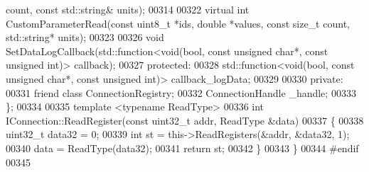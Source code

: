 \begin{DoxyCode}
      count, \textcolor{keyword}{const} std::string& units);
00314 
00322     \textcolor{keyword}{virtual} \textcolor{keywordtype}{int} CustomParameterRead(\textcolor{keyword}{const} uint8\_t *ids, \textcolor{keywordtype}{double} *values, \textcolor{keyword}{const} \textcolor{keywordtype}{size\_t} 
      count, std::string* units);
00323 
00326     \textcolor{keywordtype}{void} SetDataLogCallback(std::function<\textcolor{keywordtype}{void}(\textcolor{keywordtype}{bool}, \textcolor{keyword}{const} \textcolor{keywordtype}{unsigned} \textcolor{keywordtype}{char}*, \textcolor{keyword}{const} \textcolor{keywordtype}{unsigned} \textcolor{keywordtype}{int})> 
      callback);
00327 \textcolor{keyword}{protected}:
00328     std::function<void(bool, const unsigned char*, const unsigned int)> 
      callback_logData;
00329 
00330 \textcolor{keyword}{private}:
00331     \textcolor{keyword}{friend} \textcolor{keyword}{class }ConnectionRegistry;
00332     ConnectionHandle _handle;
00333 \};
00334 
00335 \textcolor{keyword}{template} <\textcolor{keyword}{typename} ReadType>
00336 \textcolor{keywordtype}{int} IConnection::ReadRegister(\textcolor{keyword}{const} uint32\_t addr, ReadType &data)
00337 \{
00338     uint32\_t data32 = 0;
00339     \textcolor{keywordtype}{int} st = this->ReadRegisters(&addr, &data32, 1);
00340     data = ReadType(data32);
00341     \textcolor{keywordflow}{return} st;
00342 \}
00343 \}
00344 \textcolor{preprocessor}{#endif}
00345 
\end{DoxyCode}

